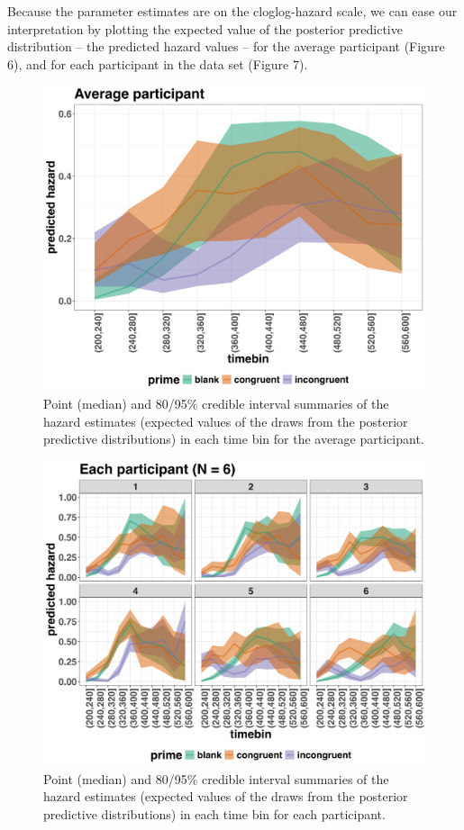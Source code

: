\documentclass[
  man, donotrepeattitle,floatsintext]{apa6}
\begin{document}
Because the parameter estimates are on the cloglog-hazard scale, we can ease our interpretation by plotting the expected value of the posterior predictive distribution -- the predicted hazard values -- for the average participant (Figure 6), and for each participant in the data set (Figure 7).



\begin{figure}[H]

{\centering \includegraphics[width=0.8\linewidth,height=0.67\textheight,]{../Tutorial_2_Bayesian/figures/M1i_pred_grand} 

}

\caption{Point (median) and 80/95\% credible interval summaries of the hazard estimates (expected values of the draws from the posterior predictive distributions) in each time bin for the average participant.}\label{fig:plot-pred-grand-effects}
\end{figure}



\begin{figure}[H]

{\centering \includegraphics[width=0.8\linewidth,height=0.67\textheight,]{../Tutorial_2_Bayesian/figures/M1i_pred_pid} 

}

\caption{Point (median) and 80/95\% credible interval summaries of the hazard estimates (expected values of the draws from the posterior predictive distributions) in each time bin for each participant.}\label{fig:plot-pred-pid-effects}
\end{figure}
\end{document}
